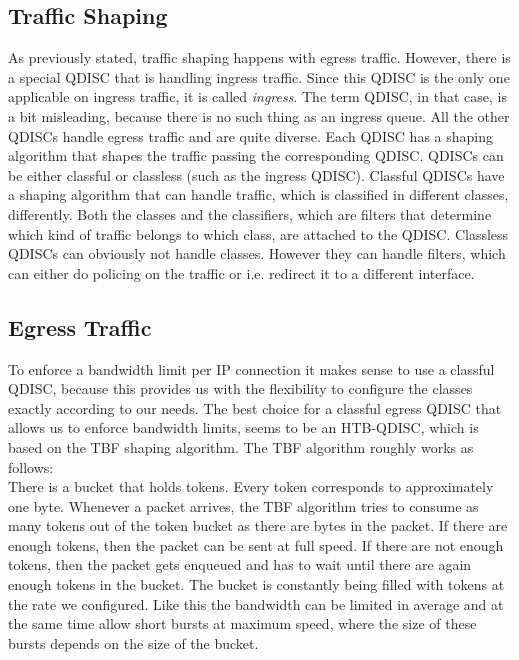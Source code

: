 \subsection{Traffic Shaping}
As previously stated, traffic shaping happens with egress traffic. However, there is a special \acs{QDISC} that is handling ingress traffic. Since this \acs{QDISC} is the only one applicable on ingress traffic, it is called \textit{ingress}. The term \acl{QDISC}, in that case, is a bit misleading, because there is no such thing as an ingress queue. All the other \acsp{QDISC} handle egress traffic and are quite diverse. Each \acs{QDISC} has a shaping algorithm that shapes the traffic passing the corresponding \acs{QDISC}. \acsp{QDISC} can be either classful or classless (such as the ingress \acs{QDISC}). Classful \acsp{QDISC} have a shaping algorithm that can handle traffic, which is classified in different classes, differently. Both the classes and the classifiers, which are filters that determine which kind of traffic belongs to which class, are attached to the \acs{QDISC}. Classless \acsp{QDISC} can obviously not handle classes. However they can handle filters, which can either do policing on the traffic or i.e. redirect it to a different interface.
\subsection{Egress Traffic}
To enforce a bandwidth limit per \acs{IP} connection it makes sense to use a classful \acs{QDISC}, because this provides us with the flexibility to configure the classes exactly according to our needs. The best choice for a classful egress \acs{QDISC} that allows us to enforce bandwidth limits, seems to be an \ac{HTB}-\acs{QDISC}, which is based on the \ac{TBF} shaping algorithm. The \acs{TBF} algorithm roughly works as follows: 
\\There is a bucket that holds tokens. Every token corresponds to approximately one byte. Whenever a packet arrives, the \acs{TBF} algorithm tries to consume as many tokens out of the token bucket as there are bytes in the packet. If there are enough tokens, then the packet can be sent at full speed. If there are not enough tokens, then the packet gets enqueued and has to wait until there are again enough tokens in the bucket. The bucket is constantly being filled with tokens at the rate we configured. Like this the bandwidth can be limited in average and at the same time allow short bursts at maximum speed, where the size of these bursts depends on the size of the bucket.

